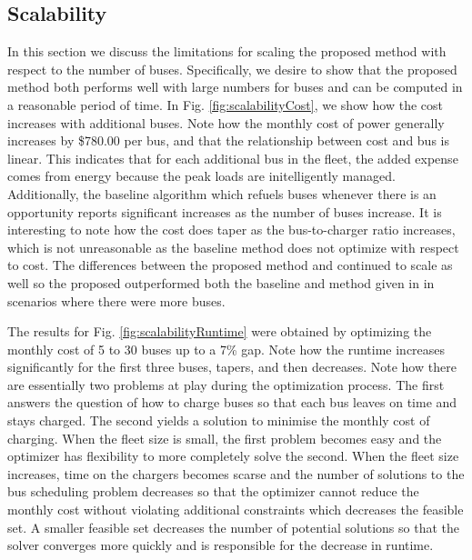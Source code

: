 \subsection{Scalability\label{sec:results:scalability}}


In this section we discuss the limitations for scaling the proposed method with respect to the number of buses. Specifically, we desire to show that the proposed method both performs well with large numbers for buses and can be computed in a reasonable period of time. In Fig. \ref{fig:scalabilityCost}, we show how the cost increases with additional buses. Note how the monthly cost of power generally increases by \$780.00 per bus, and that the relationship between cost and bus is linear. This indicates that for each additional bus in the fleet, the added expense comes from energy because the peak loads are initelligently managed. Additionally, the baseline algorithm which refuels buses whenever there is an opportunity reports significant increases as the number of buses increase. It is interesting to note how the cost does taper as the bus-to-charger ratio increases, which is not unreasonable as the baseline method does not optimize with respect to cost. The differences between the proposed method and \cite{He_2019_Fast} continued to scale as well so the proposed outperformed both the baseline and method given in \cite{He_2019_Fast} in scenarios where there were more buses. 
\par The results for Fig. \ref{fig:scalabilityRuntime} were obtained by optimizing the monthly cost of 5 to 30 buses up to a 7\% gap.  Note how the runtime increases significantly for the first three buses, tapers, and then decreases.  Note how there are essentially two problems at play during the optimization process. The first answers the question of how to charge buses so that each bus leaves on time and stays charged. The second yields a solution to minimise the monthly cost of charging. When the fleet size is small, the first problem becomes easy and the optimizer has flexibility to more completely solve the second. When the fleet size increases, time on the chargers becomes scarse and the number of solutions to the bus scheduling problem decreases so that the optimizer cannot reduce the monthly cost without violating additional constraints which decreases the feasible set. A smaller feasible set decreases the number of potential solutions so that the solver converges more quickly and is responsible for the decrease in runtime.

